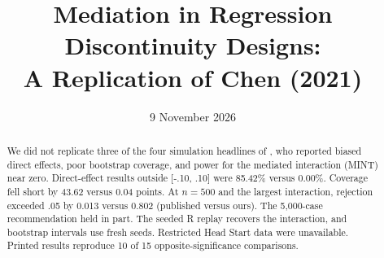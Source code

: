 
\usepackage{lmodern,enumitem}
\usepackage{needspace}
\def\UrlBreaks{\do\/\do\_\do\-}\def\UrlBigBreaks{}
\newcommand{\cp}{c$'$}

\title{Mediation in Regression Discontinuity Designs:\\A Replication of Chen (2021)}
\date{9 November 2026}




\begin{abstract}
We did not replicate three of the four simulation headlines of \citet{chen2021}, who reported biased direct effects, poor bootstrap coverage, and power for the mediated interaction (MINT) near zero. Direct-effect results outside [-.10, .10] were 85.42\% versus 0.00\%. Coverage fell short by 43.62 versus 0.04 points. At $n=500$ and the largest interaction, rejection exceeded .05 by 0.013 versus 0.802 (published versus ours). The 5,000-case recommendation held in part. The seeded R replay recovers the interaction, and bootstrap intervals use fresh seeds. Restricted Head Start data were unavailable. Printed results reproduce 10 of 15 opposite-significance comparisons.
\end{abstract}

